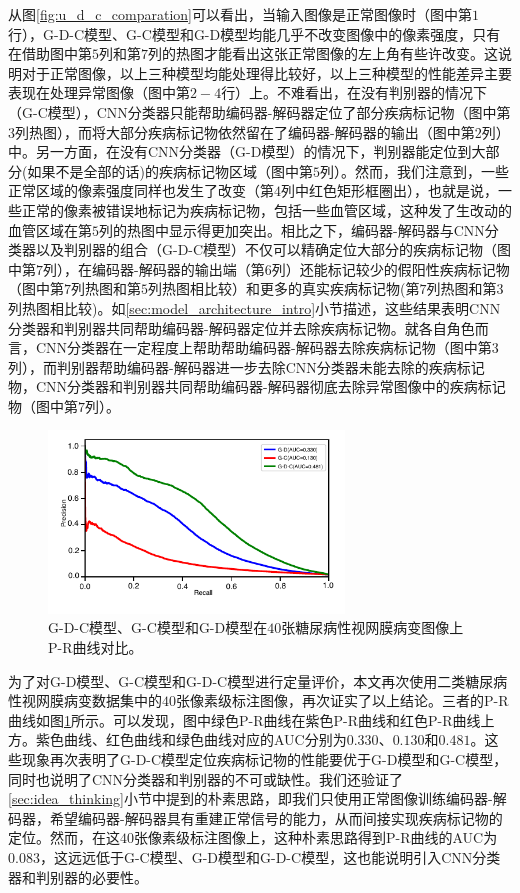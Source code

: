 从图\ref{fig:u_d_c_comparation}可以看出，当输入图像是正常图像时（图中第$1$行），G-D-C模型、G-C模型和G-D模型均能几乎不改变图像中的像素强度，只有在借助图中第$5$列和第$7$列的热图才能看出这张正常图像的左上角有些许改变。这说明对于正常图像，以上三种模型均能处理得比较好，以上三种模型的性能差异主要表现在处理异常图像（图中第$2-4$行）上。不难看出，在没有判别器的情况下（G-C模型），CNN分类器只能帮助编码器-解码器定位了部分疾病标记物（图中第$3$列热图），而将大部分疾病标记物依然留在了编码器-解码器的输出（图中第$2$列）中。另一方面，在没有CNN分类器（G-D模型）的情况下，判别器能定位到大部分(如果不是全部的话)的疾病标记物区域（图中第$5$列）。然而，我们注意到，一些正常区域的像素强度同样也发生了改变（第$4$列中红色矩形框圈出），也就是说，一些正常的像素被错误地标记为疾病标记物，包括一些血管区域，这种发了生改动的血管区域在第$5$列的热图中显示得更加突出。相比之下，编码器-解码器与CNN分类器以及判别器的组合（G-D-C模型）不仅可以精确定位大部分的疾病标记物（图中第$7$列），在编码器-解码器的输出端（第$6$列）还能标记较少的假阳性疾病标记物（图中第$7$列热图和第$5$列热图相比较）和更多的真实疾病标记物(第$7$列热图和第$3$列热图相比较)。如\ref{sec:model_architecture_intro}小节描述，这些结果表明CNN分类器和判别器共同帮助编码器-解码器定位并去除疾病标记物。就各自角色而言，CNN分类器在一定程度上帮助帮助编码器-解码器去除疾病标记物（图中第$3$列），而判别器帮助编码器-解码器进一步去除CNN分类器未能去除的疾病标记物，CNN分类器和判别器共同帮助编码器-解码器彻底去除异常图像中的疾病标记物（图中第$7$列）。
\begin{figure}[h]
	\centering
	\includegraphics[width=0.7\textwidth]{figure/pr_cureve_u_d_u_c_u_d_c_components.pdf}
	\caption[G-D-C模型、G-C模型和G-D模型P-R曲线对比]{G-D-C模型、G-C模型和G-D模型在$40$张糖尿病性视网膜病变图像上P-R曲线对比。}
	\label{fig:u_d_c_comparation_pr_curve}
\end{figure}

为了对G-D模型、G-C模型和G-D-C模型进行定量评价，本文再次使用二类糖尿病性视网膜病变数据集中的$40$张像素级标注图像，再次证实了以上结论。三者的P-R曲线如图\ref{fig:u_d_c_comparation_pr_curve}所示。可以发现，图中绿色P-R曲线在紫色P-R曲线和红色P-R曲线上方。紫色曲线、红色曲线和绿色曲线对应的AUC分别为$0.330$、$0.130$和$0.481$。这些现象再次表明了G-D-C模型定位疾病标记物的性能要优于G-D模型和G-C模型，同时也说明了CNN分类器和判别器的不可或缺性。我们还验证了\ref{sec:idea_thinking}小节中提到的朴素思路，即我们只使用正常图像训练编码器-解码器，希望编码器-解码器具有重建正常信号的能力，从而间接实现疾病标记物的定位。然而，在这$40$张像素级标注图像上，这种朴素思路得到P-R曲线的AUC为$0.083$，这远远低于G-C模型、G-D模型和G-D-C模型，这也能说明引入CNN分类器和判别器的必要性。

